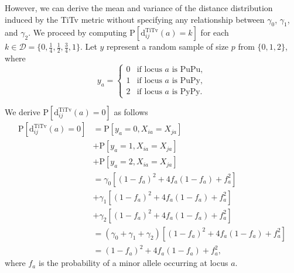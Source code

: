 \documentclass[aoas]{imsart}
\begin{document}
However, we can derive the mean and variance of the distance distribution induced by the TiTv metric without specifying any relationship between $\gamma_0$, $\gamma_1$, and $\gamma_2$. We proceed by computing $\text{P}\left[\text{d}^\text{TiTv}_{ij}(a) = k\right]$ for each $k \in \mathcal{D} = \bigl\{0,\frac{1}{4},\frac{1}{2},\frac{3}{4},1\bigr\}$. Let $y$ represent a random sample of size $p$ from $\{0,1,2\}$, where 
%
\begin{equation}\label{eq:yvec}
y_a = \begin{cases}
0 & \text{if locus } a \text{ is PuPu}, \\
1 & \text{if locus } a \text{ is PuPy}, \\
2 & \text{if locus } a \text{ is PyPy}.
\end{cases}
\end{equation}

We derive $\text{P}\left[\text{d}^\text{TiTv}_{ij}(a) = 0\right]$ as follows
%
\begin{equation}\label{eq:prob_TiTv_0}
\begin{aligned}
\text{P}\left[\text{d}^\text{TiTv}_{ij}(a) = 0\right] &= \text{P}\left[y_a = 0, X_{ia} = X_{ja}\right] \\
&+ \text{P}\left[y_a = 1, X_{ia} = X_{ja}\right] \\
&+ \text{P}\left[y_a = 2, X_{ia} = X_{ja}\right] \\
&= \gamma_0 \left[(1 - f_a)^2 + 4 f_a (1 - f_a) + f^2_a\right] \\
&+ \gamma_1 \left[(1 - f_a)^2 + 4 f_a (1 - f_a) + f^2_a\right] \\
&+ \gamma_2 \left[(1 - f_a)^2 + 4 f_a (1 - f_a) + f^2_a\right] \\
&= (\gamma_0 + \gamma_1 + \gamma_2)\left[(1 - f_a)^2 + 4 f_a (1 - f_a) + f^2_a\right] \\
&= (1 - f_a)^2 + 4 f_a (1 - f_a) + f^2_a,
\end{aligned}
\end{equation}
%
where $f_a$ is the probability of a minor allele occurring at locus $a$.
\end{document}
